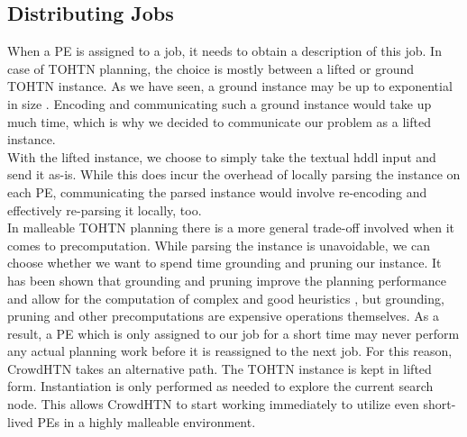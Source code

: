 \subsection{Distributing Jobs}
When a PE is assigned to a job, it needs to obtain a description of this job. In case of TOHTN planning, the choice is mostly between a lifted or ground TOHTN instance. As we have seen, a ground instance may be up to exponential in size \cite{behnke2020succinct}. Encoding and communicating such a ground instance would take up much time, which is why we decided to communicate our problem as a lifted instance. \\
With the lifted instance, we choose to simply take the textual hddl input \cite{holler2020hddl} and send it as-is. While this does incur the overhead of locally parsing the instance on each PE, communicating the parsed instance would involve re-encoding and effectively re-parsing it locally, too. \\
In malleable TOHTN planning there is a more general trade-off involved when it comes to precomputation. While parsing the instance is unavoidable, we can choose whether we want to spend time grounding and pruning our instance. It has been shown that grounding and pruning improve the planning performance \cite{behnke2020succinct} and allow for the computation of complex and good heuristics \cite{holler2020htn}, but grounding, pruning and other precomputations are expensive operations themselves. As a result, a PE which is only assigned to our job for a short time may never perform any actual planning work before it is reassigned to the next job. For this reason, CrowdHTN takes an alternative path. The TOHTN instance is kept in lifted form. Instantiation is only performed as needed to explore the current search node. This allows CrowdHTN to start working immediately to utilize even short-lived PEs in a highly malleable environment.
\begin{comment}
- grounded instance may be exponential in size
- exceedingly high communication cost
- lifted instance it is
- sending a parsed instance - we still need to encode and decode it for sending
- we would effectively have to build a parser for this
- we already do have a parser
- we simply encode the string and parse locally
- not a core issue to us, so we go for ease of implementation
\end{comment}

